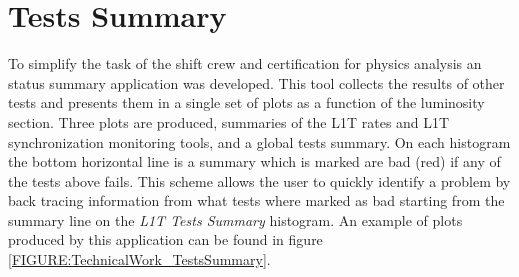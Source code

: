 \section{Tests Summary}


To simplify the task of the shift crew and certification for physics analysis an status summary application was developed. This tool collects the results of other tests and presents them in a single set of plots as a function of the luminosity section. Three plots are produced, summaries of the \gls{L1T} rates and \gls{L1T} synchronization monitoring tools, and a global tests summary. On each histogram the bottom horizontal line is a summary which is marked are bad (red) if any of the tests above fails. This scheme allows the user to quickly identify a problem by back tracing information from what tests where marked as bad starting from the summary line on the \textit{L1T Tests Summary} histogram. An example of plots produced by this application can be found in figure \ref{FIGURE:TechnicalWork_TestsSummary}.

